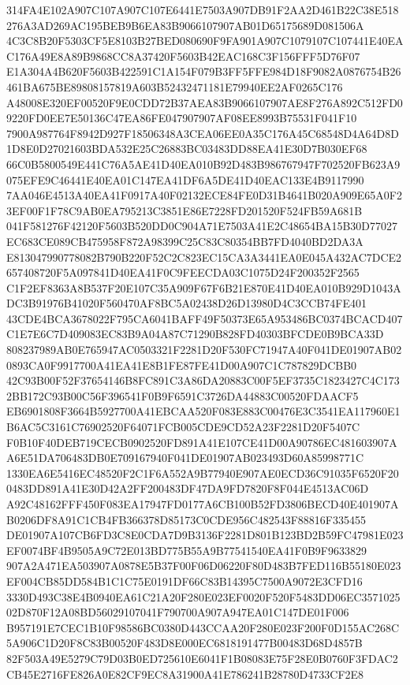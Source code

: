 \documentclass[UTF8,fontset=fandol,zihao=-4,a4paper]{ctexart}
\begin{document}
{{314FA4E102A907C107A907C107E6441E7503A907DB91F2AA2D461B22C38E518276A3AD269AC195BEB9B6EA83B9066107907AB01D65175689D081506A
4C3C8B20F5303CF5E8103B27BED080690F9FA901A907C1079107C107441E40EAC176A49E8A89B9868CC8A37420F5603B42EAC168C3F156FFF5D76F07
E1A304A4B620F5603B422591C1A154F079B3FF5FFE984D18F9082A0876754B26461BA675BE89808157819A603B52432471181E79940EE2AF0265C176
A48008E320EF00520F9E0CDD72B37AEA83B9066107907AE8F276A892C512FD09220FD0EE7E50136C47EA86FE047907907AF08EE8993B75531F041F10
7900A987764F8942D927F18506348A3CEA06EE0A35C176A45C68548D4A64D8D1D8E0D27021603BDA532E25C26883BC03483DD88EA41E30D7B030EF68
66C0B5800549E441C76A5AE41D40EA010B92D483B986767947F702520FB623A9075EFE9C46441E40EA01C147EA41DF6A5DE41D40EAC133E4B9117990
7AA046E4513A40EA41F0917A40F02132ECE84FE0D31B4641B020A909E65A0F23EF00F1F78C9AB0EA795213C3851E86E7228FD201520F524FB59A681B
041F581276F42120F5603B520DD0C904A71E7503A41E2C48654BA15B30D77027EC683CE089CB475958F872A98399C25C83C80354BB7FD4040BD2DA3A
E813047990778082B790B220F52C2C823EC15CA3A3441EA0E045A432AC7DCE2657408720F5A097841D40EA41F0C9FEECDA03C1075D24F200352F2565
C1F2EF8363A8B537F20E107C35A909F67F6B21E870E41D40EA010B929D1043ADC3B91976B41020F560470AF8BC5A02438D26D13980D4C3CCB74FE401
43CDE4BCA3678022F795CA6041BAFF49F50373E65A953486BC0374BCACD407C1E7E6C7D409083EC83B9A04A87C71290B828FD40303BFCDE0B9BCA33D
808237989AB0E765947AC0503321F2281D20F530FC71947A40F041DE01907AB020893CA0F9917700A41EA41E8B1FE87FE41D00A907C1C787829DCBB0
42C93B00F52F37654146B8FC891C3A86DA20883C00F5EF3735C1823427C4C1732BB172C93B00C56F396541F0B9F6591C3726DA44883C00520FDAACF5
EB6901808F3664B5927700A41EBCAA520F083E883C00476E3C3541EA117960E1B6AC5C3161C76902520F64071FCB005CDE9CD52A23F2281D20F5407C
F0B10F40DEB719CECB0902520FD891A41E107CE41D00A90786EC481603907AA6E51DA706483DB0E709167940F041DE01907AB023493D60A85998771C
1330EA6E5416EC48520F2C1F6A552A9B77940E907AE0ECD36C91035F6520F200483DD891A41E30D42A2FF200483DF47DA9FD7820F8F044E4513AC06D
A92C48162FFF450F083EA17947FD0177A6CB100B52FD3806BECD40E401907AB0206DF8A91C1CB4FB366378D85173C0CDE956C482543F88816F335455
DE01907A107CB6FD3C8E0CDA7D9B3136F2281D801B123BD2B59FC47981E023EF0074BF4B9505A9C72E013BD775B55A9B77541540EA41F0B9F9633829
907A2A471EA503907A0878E5B37F00F06D06220F80D483B7FED116B55180E023EF004CB85DD584B1C1C75E0191DF66C83B14395C7500A9072E3CFD16
3330D493C38E4B0940EA61C21A20F280E023EF0020F520F5483DD06EC357102502D870F12A08BD56029107041F790700A907A947EA01C147DE01F006
B957191E7CEC1B10F98586BC0380D443CCAA20F280E023F200F0D155AC268C5A906C1D20F8C83B00520F483D8E000EC6818191477B00483D68D4857B
82F503A49E5279C79D03B0ED725610E6041F1B08083E75F28E0B0760F3FDAC2CB45E2716FE826A0E82CF9EC8A31900A41E786241B28780D4733CF2E8
}}
\end{document}
